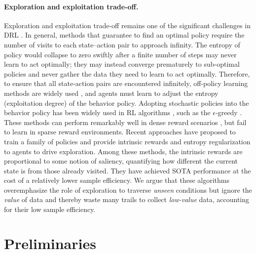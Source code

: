 \documentclass[nohyperref]{article}
\newcommand{\changnan}[1]{{\color{red}{\small\bf\sf [changnan: #1]}}}
\theoremstyle{plain}
\begin{document}
\paragraph{Exploration and exploitation trade-off. } Exploration and exploitation trade-off remains one of the significant  challenges in DRL \citep{ngu,sutton}.  In general, methods that guarantee to find an optimal policy require the number of visits to each state–action pair to approach infinity. The entropy of policy would collapse
to zero swiftly after a finite number of steps may never learn to act optimally; they may instead converge prematurely to sub-optimal policies and never gather the data they need to learn to act optimally. Therefore, to ensure that all state-action pairs are encountered infinitely, off-policy learning methods are widely used \citep{a3c,impala}, and agents must learn to adjust the entropy (exploitation degree) of the behavior policy. Adopting stochastic policies into the behavior policy has been widely used in RL algorithms \citep{dqn,rainbow}, such as the $\epsilon$-greedy \citep{epsilongreedy}. These methods  can perform remarkably well in dense reward scenarios \citep{dqn}, but fail to learn in  sparse reward environments. Recent approaches \citep{agent57} have proposed to train a family of policies and provide  intrinsic rewards and entropy regularization to agents to drive exploration. Among these methods, the intrinsic rewards  are proportional to some notion of saliency, quantifying how different the current state is from those already visited.  They have achieved SOTA performance at the cost of a relatively lower sample efficiency.  We argue that these algorithms overemphasize the role of exploration to traverse \emph{unseen} conditions but ignore the \emph{value} of data and thereby waste many trails to collect \emph{low-value} data, accounting for their low sample efficiency.
\section{Preliminaries}
\end{document}
